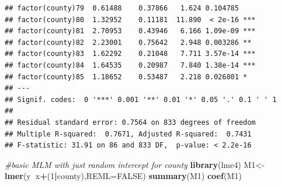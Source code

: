 \documentclass[ignorenonframetext,]{beamer}
\newenvironment{Shaded}{\begin{snugshade}}{\end{snugshade}}
\newcommand{\KeywordTok}[1]{\textcolor[rgb]{0.13,0.29,0.53}{\textbf{#1}}}
\newcommand{\DataTypeTok}[1]{\textcolor[rgb]{0.13,0.29,0.53}{#1}}
\newcommand{\DecValTok}[1]{\textcolor[rgb]{0.00,0.00,0.81}{#1}}
\newcommand{\CommentTok}[1]{\textcolor[rgb]{0.56,0.35,0.01}{\textit{#1}}}
\newcommand{\OtherTok}[1]{\textcolor[rgb]{0.56,0.35,0.01}{#1}}
\newcommand{\OperatorTok}[1]{\textcolor[rgb]{0.81,0.36,0.00}{\textbf{#1}}}
\newcommand{\NormalTok}[1]{#1}
\begin{document}
\begin{frame}[fragile]{}
\begin{verbatim}
## factor(county)79  0.61488    0.37866   1.624 0.104785    
## factor(county)80  1.32952    0.11181  11.890  < 2e-16 ***
## factor(county)81  2.70953    0.43946   6.166 1.09e-09 ***
## factor(county)82  2.23001    0.75642   2.948 0.003286 ** 
## factor(county)83  1.62292    0.21048   7.711 3.57e-14 ***
## factor(county)84  1.64535    0.20987   7.840 1.38e-14 ***
## factor(county)85  1.18652    0.53487   2.218 0.026801 *  
## ---
## Signif. codes:  0 '***' 0.001 '**' 0.01 '*' 0.05 '.' 0.1 ' ' 1
## 
## Residual standard error: 0.7564 on 833 degrees of freedom
## Multiple R-squared:  0.7671, Adjusted R-squared:  0.7431 
## F-statistic: 31.91 on 86 and 833 DF,  p-value: < 2.2e-16
\end{verbatim}

\end{frame}

\begin{frame}[fragile]{}

\begin{Shaded}
\begin{Highlighting}[]
\CommentTok{#basic MLM with just random intercept for county}
\KeywordTok{library}\NormalTok{(lme4)}
\NormalTok{M1<-}\KeywordTok{lmer}\NormalTok{(y}\OperatorTok{~}\NormalTok{x}\OperatorTok{+}\NormalTok{(}\DecValTok{1}\OperatorTok{|}\NormalTok{county),}\DataTypeTok{REML=}\OtherTok{FALSE}\NormalTok{)}
\KeywordTok{summary}\NormalTok{(M1)}
\KeywordTok{coef}\NormalTok{(M1)}
\end{Highlighting}
\end{Shaded}

\end{frame}
\end{document}
